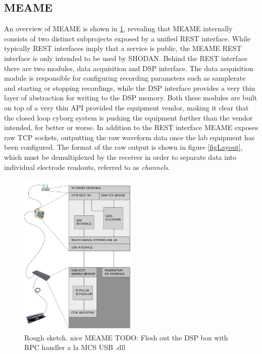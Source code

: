 \subsection{MEAME}
An overview of MEAME is shown in \ref{figMEAME}, revealing that MEAME internally
consists of two distinct subprojects exposed by a unified REST interface.
While typically REST interfaces imply that a service is public, the MEAME REST
interface is only intended to be used by SHODAN.
%
Behind the REST interface there are two modules, data acquisition and DSP interface.
%
The data acquisition module is responsible for configuring recording parameters
such as samplerate and starting or stopping recordings, while the DSP interface
provides a very thin layer of abstraction for writing to the DSP memory.
%
Both these modules are built on top of a very thin API provided the equipment
vendor, making it clear that the closed loop cyborg system is pushing the
equipment further than the vendor intended, for better or worse.
%
In addition to the REST interface MEAME exposes raw TCP sockets, outputting the
raw waveform data once the lab equipment has been configured.
%
The format of the raw output is shown in figure \ref{figLayout}, which must be
demultiplexed by the receiver in order to separate data into individual
electrode readouts, referred to as \emph{channels}.
%
\begin{figure}[h!]
  \centering
  \includegraphics[width=0.5\textwidth]{fig/MEAME.png}
  \caption{Rough sketch.
    nice MEAME
    TODO: Flesh out the DSP box with RPC handler a la MCS USB .dll
  }
  \label{figMEAME}
\end{figure}

